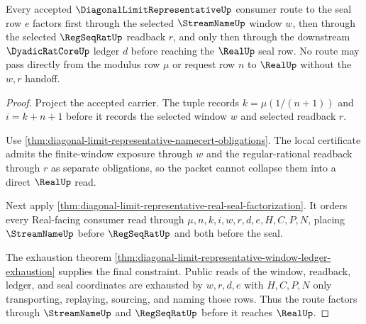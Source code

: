 \begin{theorem}
\label{thm:diagonal-limit-representative-streamname-regseqrat-handoff}
Every accepted $\DiagonalLimitRepresentativeUp$ consumer route to the seal row $e$ factors first through the selected $\StreamNameUp$ window $w$, then through the selected $\RegSeqRatUp$ readback $r$, and only then through the downstream $\DyadicRatCoreUp$ ledger $d$ before reaching the $\RealUp$ seal row. No route may pass directly from the modulus row $\mu$ or request row $n$ to $\RealUp$ without the $w,r$ handoff.
\end{theorem}
\begin{proof}
Project the accepted carrier. The tuple records $k=\mu(1/(n+1))$ and $i=k+n+1$ before it records the selected window $w$ and selected readback $r$.

Use \autoref{thm:diagonal-limit-representative-namecert-obligations}. The local certificate admits the finite-window exposure through $w$ and the regular-rational readback through $r$ as separate obligations, so the packet cannot collapse them into a direct $\RealUp$ read.

Next apply \autoref{thm:diagonal-limit-representative-real-seal-factorization}. It orders every Real-facing consumer read through $\mu,n,k,i,w,r,d,e,H,C,P,N$, placing $\StreamNameUp$ before $\RegSeqRatUp$ and both before the seal.

The exhaustion theorem \autoref{thm:diagonal-limit-representative-window-ledger-exhaustion} supplies the final constraint. Public reads of the window, readback, ledger, and seal coordinates are exhausted by $w,r,d,e$ with $H,C,P,N$ only transporting, replaying, sourcing, and naming those rows. Thus the route factors through $\StreamNameUp$ and $\RegSeqRatUp$ before it reaches $\RealUp$.
\end{proof}

